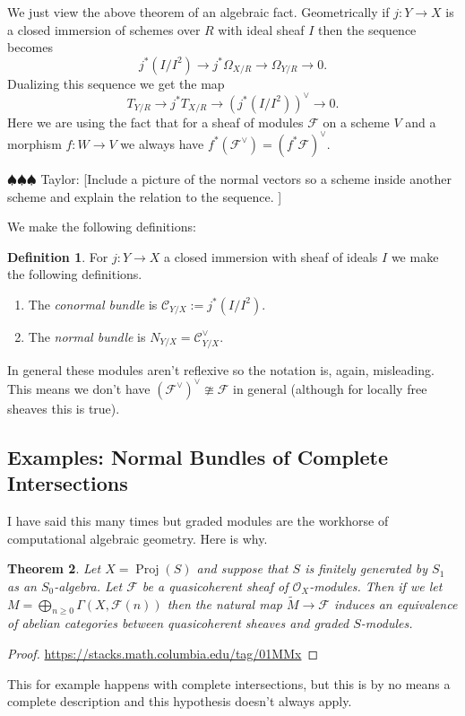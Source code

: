 \documentclass[12pt]{article}
\numberwithin{equation}{section}
\newtheorem{theorem}{Theorem}[subsection]
\theoremstyle{definition}
\newtheorem{definition}[theorem]{Definition}
\theoremstyle{remark}
\newcommand{\Ocal}{\mathcal{O}}
\newcommand{\Proj}{\operatorname{Proj}}
\newcommand{\Fcal}{\mathcal{F}}
\newcommand{\taylor}[1]{{\color{blue} \sf $\spadesuit\spadesuit\spadesuit$ Taylor: [#1]}}
\begin{document}
We just view the above theorem of an algebraic fact. 
Geometrically if $j: Y\to X$ is a closed immersion of schemes over $R$ with ideal sheaf $I$ then the sequence becomes 
 $$j^*(I/I^2) \to j^*\Omega_{X/R} \to \Omega_{Y/R} \to 0.$$
Dualizing this sequence we get the map 
 $$ T_{Y/R} \to j^*T_{X/R} \to \left( j^*( I/I^2) \right)^{\vee} \to 0. $$
Here we are using the fact that for a sheaf of modules $\Fcal$ on a scheme $V$ and a morphism $f:W\to V$ we always have $f^*(\Fcal^{\vee}) = (f^*\Fcal)^{\vee}$.

\taylor{Include a picture of the normal vectors so a scheme inside another scheme and explain the relation to the sequence. }

We make the following definitions:
\begin{definition}
	For $j:Y\to X$ a closed immersion with sheaf of ideals $I$ we make the following definitions.
	\begin{enumerate}
		\item The \emph{conormal bundle} is $\mathcal{C}_{Y/X} := j^*(I/I^2)$. 
	    \item The \emph{normal bundle} is $N_{Y/X} = \mathcal{C}_{Y/X}^{\vee}$.
	\end{enumerate}
\end{definition}
In general these modules aren't reflexive so the notation is, again, misleading. 
This means we don't have $(\Fcal^{\vee})^{\vee} \ncong \Fcal$ in general (although for locally free sheaves this is true).

\subsection{Examples: Normal Bundles of Complete Intersections}
I have said this many times but graded modules are the workhorse of computational algebraic geometry. 
Here is why. 
\begin{theorem}
	Let $X = \Proj(S)$ and suppose that $S$ is finitely generated by $S_1$ as an $S_0$-algebra. Let $\Fcal$ be a quasicoherent sheaf of $\Ocal_X$-modules. 
	Then if we let $M = \bigoplus_{n\geq 0} \Gamma(X,\Fcal(n))$ then the natural map $\widetilde{M} \to \Fcal$ induces an equivalence of abelian categories between quasicoherent sheaves and graded $S$-modules. 
\end{theorem}
\begin{proof}
	\url{https://stacks.math.columbia.edu/tag/01MMx}
\end{proof}

This for example happens with complete intersections, but this is by no means a complete description and this hypothesis doesn't always apply.
\end{document}
